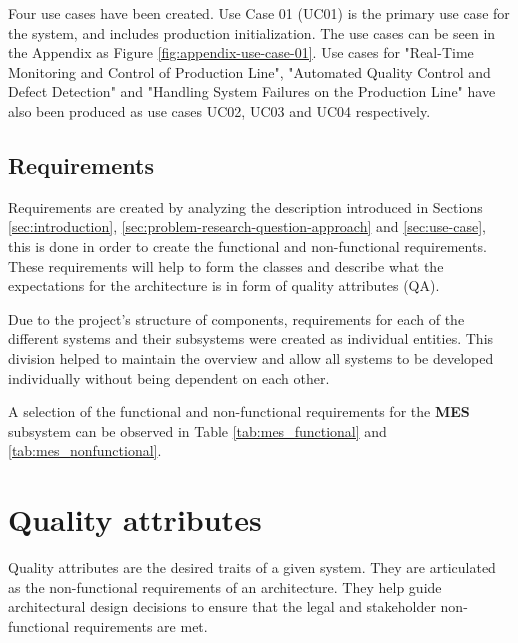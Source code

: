 Four use cases have been created. Use Case 01 (UC01) is the primary use case for the system, and includes production initialization. The use cases can be seen in the Appendix as Figure \ref{fig:appendix-use-case-01}. Use cases for "Real-Time Monitoring and Control of Production Line", "Automated Quality Control and Defect Detection" and "Handling System Failures on the Production Line" have also been produced as use cases UC02, UC03 and UC04 respectively.

\subsection{Requirements}
Requirements are created by analyzing the description introduced in Sections \ref{sec:introduction}, \ref{sec:problem-research-question-approach} and \ref{sec:use-case}, this is done in order to create the functional and non-functional requirements. These requirements will help to form the classes and describe what the expectations for the architecture is in form of quality attributes (QA).

Due to the project's structure of components, requirements for each of the different systems and their subsystems were created as individual entities. This division helped to maintain the overview and allow all systems to be developed individually without being dependent on each other. 


A selection of the functional and non-functional requirements for the \textbf{MES} subsystem can be observed in Table \ref{tab:mes_functional} and \ref{tab:mes_nonfunctional}.

\section{Quality attributes} \label{sec:quality-attribute-scenario}
Quality attributes are the desired traits of a given system. 
They are articulated as the non-functional requirements of an architecture. They help guide architectural design decisions to ensure that the legal and stakeholder non-functional requirements are met.


